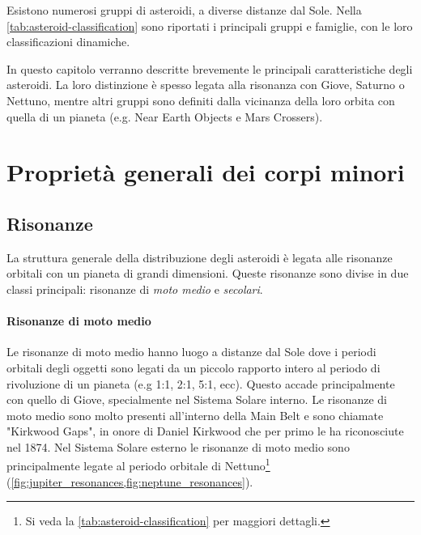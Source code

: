\documentclass[a4paper,11pt,openright]{book}
\begin{document}
Esistono numerosi gruppi di asteroidi, a diverse distanze dal Sole. Nella \cref{tab:asteroid-classification} sono riportati i principali gruppi e famiglie, con le loro classificazioni dinamiche.

In questo capitolo verranno descritte brevemente le principali caratteristiche degli asteroidi. La loro distinzione è spesso legata alla risonanza con Giove, Saturno o Nettuno, mentre altri gruppi sono definiti dalla vicinanza della loro orbita con quella di un pianeta (e.g. Near Earth Objects e Mars Crossers).

\section{Proprietà generali dei corpi minori}


\subsection{Risonanze}
La struttura generale della distribuzione degli asteroidi è legata alle risonanze orbitali con un pianeta di grandi dimensioni. Queste risonanze sono divise in due classi principali: risonanze di \textit{moto medio} e \textit{secolari}.

\paragraph*{Risonanze di moto medio} 
Le risonanze di moto medio hanno luogo a distanze dal Sole dove i periodi orbitali degli oggetti sono legati da un piccolo rapporto intero al periodo di rivoluzione di un pianeta (e.g 1:1, 2:1, 5:1, ecc). Questo accade principalmente con quello di Giove, specialmente nel Sistema Solare interno. Le risonanze di moto medio sono molto presenti all'interno della Main Belt e sono chiamate "Kirkwood Gaps", in onore di Daniel Kirkwood che per primo le ha riconosciute nel 1874. Nel Sistema Solare esterno le risonanze di moto medio sono principalmente legate al periodo orbitale di Nettuno\footnote{Si veda la \cref{tab:asteroid-classification} per maggiori dettagli.} (\cref{fig:jupiter_resonances,fig:neptune_resonances}).
\end{document}
